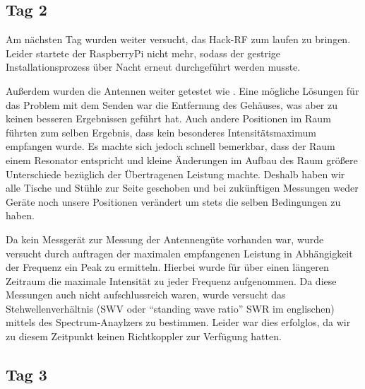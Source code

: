 \documentclass[titlepage,11pt,a4paper,ngerman]{article}
\begin{document}
\subsection{Tag 2}

Am nächsten Tag wurden weiter versucht, das Hack-RF zum laufen zu bringen. Leider startete der RaspberryPi nicht mehr, sodass der gestrige Installationsprozess über Nacht erneut durchgeführt werden musste.\par
Außerdem wurden die Antennen weiter getestet wie . Eine mögliche Lösungen für das Problem mit dem Senden war die Entfernung des Gehäuses, was aber zu keinen besseren Ergebnissen geführt hat. Auch andere Positionen im Raum führten zum selben Ergebnis, dass kein besonderes Intensitätsmaximum empfangen wurde. Es machte sich jedoch schnell bemerkbar, dass der Raum einem Resonator entspricht und kleine Änderungen im Aufbau des Raum größere Unterschiede bezüglich der Übertragenen Leistung machte. Deshalb haben wir alle Tische und Stühle zur Seite geschoben und bei zukünftigen Messungen weder Geräte noch unsere Positionen verändert um stets die selben Bedingungen zu haben.\par
Da kein Messgerät zur Messung der Antennengüte vorhanden war, wurde versucht durch auftragen der maximalen empfangenen Leistung in Abhängigkeit der Frequenz ein Peak zu ermitteln. Hierbei wurde für über einen längeren Zeitraum die maximale Intensität zu jeder Frequenz aufgenommen. Da diese Messungen auch nicht aufschlussreich waren, wurde versucht das Stehwellenverhältnis (SWV oder ``standing wave ratio'' SWR im englischen) mittels des Spectrum-Anaylzers zu bestimmen. Leider war dies erfolglos, da wir zu diesem Zeitpunkt keinen Richtkoppler zur Verfügung hatten.

\subsection{Tag 3}
\end{document}
